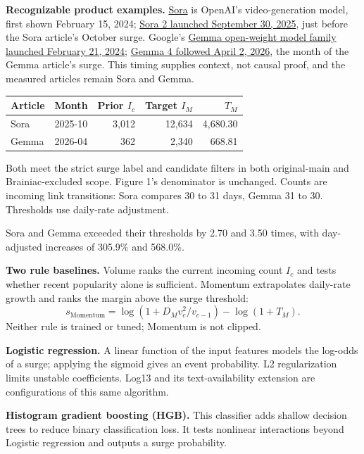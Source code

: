 \documentclass[11pt,letterpaper]{article}
\newcommand{\sect}[1]{\vspace{4pt}{\large\bfseries\color{teal}#1}\par}
\begin{document}
\textbf{Recognizable product examples.} \href{https://openai.com/index/sora/}{Sora} is OpenAI's video-generation model, first shown February 15, 2024; \href{https://openai.com/index/sora-2/}{Sora 2 launched September 30, 2025}, just before the Sora article's October surge. Google's \href{https://blog.google/innovation-and-ai/technology/developers-tools/gemma-open-models/}{Gemma open-weight model family launched February 21, 2024}; \href{https://cloud.google.com/blog/products/ai-machine-learning/gemma-4-available-on-google-cloud/}{Gemma 4 followed April 2, 2026}, the month of the Gemma article's surge. This timing supplies context, not causal proof, and the measured articles remain Sora and Gemma.
\begin{center}\small
\begin{tabular}{@{}llrrr@{}}\toprule
Article & Month & Prior $I_c$ & Target $I_M$ & $T_M$\\\midrule
Sora & 2025-10 & 3,012 & 12,634 & 4,680.30\\
Gemma & 2026-04 & 362 & 2,340 & 668.81\\
\bottomrule\end{tabular}\end{center}
{\small Both meet the strict surge label and candidate filters in both original-main and Brainiac-excluded scope. Figure 1's denominator is unchanged. Counts are incoming link transitions: Sora compares 30 to 31 days, Gemma 31 to 30. Thresholds use daily-rate adjustment.}

Sora and Gemma exceeded their thresholds by 2.70 and 3.50 times, with day-adjusted increases of 305.9\% and 568.0\%.

\newpage
\sect{3. Models: what is learned and why}
\textbf{Two rule baselines.} Volume ranks the current incoming count $I_c$ and tests whether recent popularity alone is sufficient. Momentum extrapolates daily-rate growth and ranks the margin above the surge threshold:
\[
 s_{\mathrm{Momentum}}=\log(1+D_Mv_c^2/v_{c-1})-\log(1+T_M).
\]
Neither rule is trained or tuned; Momentum is not clipped.

\textbf{Logistic regression.} A linear function of the input features models the log-odds of a surge; applying the sigmoid gives an event probability. L2 regularization limits unstable coefficients. Log13 and its text-availability extension are configurations of this same algorithm.

\textbf{Histogram gradient boosting (HGB).} This classifier adds shallow decision trees to reduce binary classification loss. It tests nonlinear interactions beyond Logistic regression and outputs a surge probability.
\end{document}
